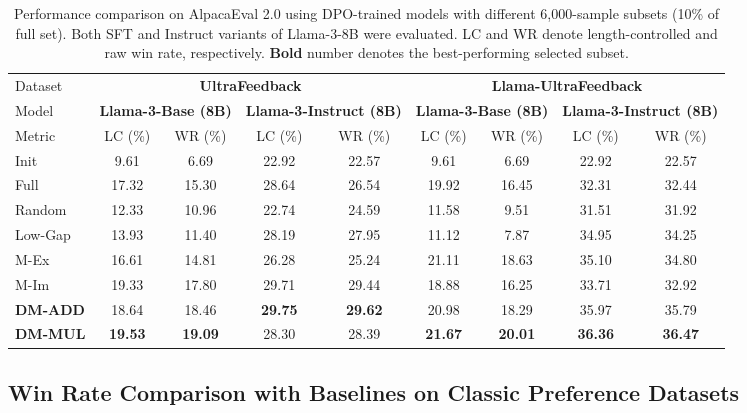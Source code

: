 {\begin{table*}[t]
    \centering
    \setlength{\abovecaptionskip}{0.1cm}
    \setlength{\belowcaptionskip}{0cm}
    \setlength{\tabcolsep}{12pt} 
    \caption{Performance comparison on AlpacaEval 2.0 using DPO-trained models with different 6,000-sample subsets (10\% of full set). Both SFT and Instruct variants of Llama-3-8B were evaluated. LC and WR denote length-controlled and raw win rate, respectively. \textbf{Bold} number denotes the best-performing selected subset.}
    \label{tab:offline}
    \small
    \begin{tabular}{l|cccc|cccc}
    \toprule
    Dataset & \multicolumn{4}{c|}{\textbf{UltraFeedback}} & \multicolumn{4}{c}{\textbf{Llama-UltraFeedback}} \\
    Model & \multicolumn{2}{c}{\textbf{Llama-3-Base (8B)}} & \multicolumn{2}{c|}{\textbf{Llama-3-Instruct (8B)}} & \multicolumn{2}{c}{\textbf{Llama-3-Base (8B)}} & \multicolumn{2}{c}{\textbf{Llama-3-Instruct (8B)}}\\
    \midrule
    Metric & LC (\%) & WR (\%) & LC (\%) & WR (\%) &LC (\%) & WR (\%) & LC (\%) & WR (\%) \\
    \midrule
    Init & 9.61 & 6.69 & 22.92 & 22.57 & 9.61 & 6.69 & 22.92 & 22.57 \\
    \midrule
    Full & 17.32 & 15.30 & 28.64 &26.54 & 19.92 & 16.45 & 32.31 & 32.44\\
    Random & 12.33 & 10.96 & 22.74 & 24.59& 11.58 & 9.51 & 31.51 & 31.92\\
    Low-Gap & 13.93 & 11.40 & 28.19 & 27.95& 11.12 & 7.87 & 34.95 & 34.25\\
    M-Ex & 16.61 & 14.81 & 26.28& 25.24& 21.11 & 18.63 & 35.10 & 34.80\\
    M-Im & 19.33 & 17.80 & 29.71&29.44 & 18.88 & 16.25 & 33.71 & 32.92\\
    \textbf{DM-ADD}  & 18.64 & 18.46 & \textbf{29.75} & \textbf{29.62}& 20.98 & 18.29 & 35.97 & 35.79\\
    \textbf{DM-MUL} & \textbf{19.53} & \textbf{19.09} & 28.30 & 28.39& \textbf{21.67} & \textbf{20.01} & \textbf{36.36} & \textbf{36.47}\\
         \bottomrule
    \end{tabular}
    \vspace{-8pt}
\end{table*}

\subsection{Win Rate Comparison with Baselines on Classic Preference Datasets}
\label{exp:off-3b}

}
